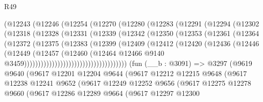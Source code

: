 \begin{lexlean}{R49}
\begin{coremodule}
                (@12243
                  (@12246
                    (@12254
                      (@12270
                        (@12280
                          (@12283
                            (@12291
                              (@12294
                                (@12302
                                  (@12318
                                    (@12328
                                      (@12331
                                        (@12339
                                          (@12342
                                            (@12350
                                              (@12353
                                                (@12361
                                                  (@12364
                                                    (@12372
                                                      (@12375
                                                        (@12383
                                                          (@12399
                                                            (@12409
                                                              (@12412
                                                                (@12420
                                                                  (@12436
                                                                    (@12446
                                                                      (@12449
                                                                        (@12457
                                                                          (@12460
                                                                            (@12464
                                                                              @12466
                                                                              @9140
                                                                              @3459)))))))))))))))))))))))))))))))))))))
    (fun (__b : @3091) =>
    @3297
      (@9619
        @9640
        (@9617
          @12201
          @12204
          @9644
          (@9617
            @12212
            @12215
            @9648
            (@9617
              @12238
              @12241
              @9652
              (@9617
                @12249
                @12252
                @9656
                (@9617
                  @12275
                  @12278
                  @9660
                  (@9617
                    @12286
                    @12289
                    @9664
                    (@9617
                      @12297
                      @12300

\end{coremodule}
\end{lexlean}
